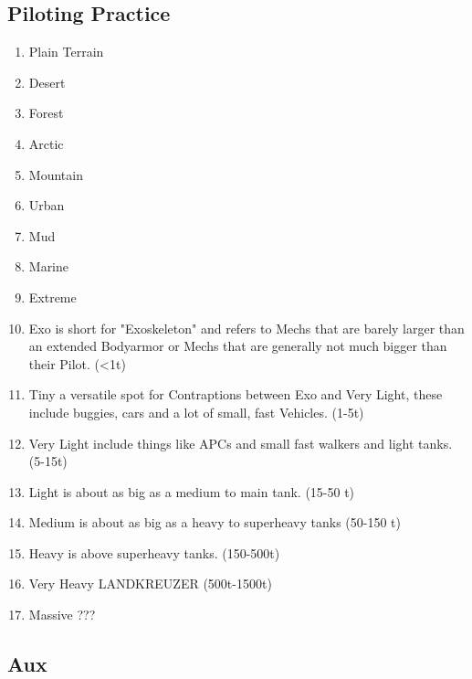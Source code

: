 \subsection{Piloting Practice}\label{subsec:piloting-practice}
\begin{enumerate}
    \item {Plain} Terrain
    \item {Desert}
    \item {Forest}
    \item {Arctic}
    \item {Mountain}
    \item {Urban}
    \item {Mud}
    \item {Marine}
    \item {Extreme}

    \item {Exo} is short for "Exoskeleton" and refers to Mechs that are barely larger than an extended Bodyarmor
    or Mechs that are generally not much bigger than their Pilot. (<1t)
    \item {Tiny} a versatile spot for Contraptions between Exo and Very Light, these include buggies, cars and
    a lot of small, fast Vehicles. (1-5t)
    \item {Very Light} include things like APCs and small fast walkers and light tanks.(5-15t)
    \item {Light} is about as big as a medium to main tank. (15-50 t)
    \item {Medium} is about as big as a heavy to superheavy tanks (50-150 t)
    \item {Heavy} is above superheavy tanks. (150-500t)
    \item {Very Heavy} LANDKREUZER (500t-1500t)
    \item {Massive} ???
\end{enumerate}
\subsection{Aux}\label{subsec:aux}
